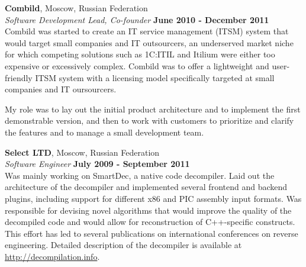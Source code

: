 \documentclass[margin,line]{CV}
\begin{document}
\begin{resume}
    
    \textbf{Combild}, Moscow, Russian Federation \vspace{2mm}\\\vspace{1mm}%
    \textsl{Software Development Lead, Co-founder} \hfill \textbf{June 2010 - December 2011}\\
    Combild was started to create an IT service management (ITSM) system that would target small companies and IT outsourcers, an underserved market niche for which competing solutions such as 1C:ITIL and Itilium were either too expensive or excessively complex. Combild was to offer a lightweight and user-friendly ITSM system with a licensing model specifically targeted at small companies and IT oursourcers.


    My role was to lay out the initial product architecture and to implement the first demonstrable version, and then to work with customers to prioritize and clarify the features and to manage a small development team. 
    

    
    \textbf{Select LTD}, Moscow, Russian Federation \vspace{2mm}\\\vspace{1mm}%
    \textsl{Software Engineer} \hfill \textbf{July 2009 - September 2011}\\
    Was mainly working on SmartDec, a native code decompiler. Laid out the architecture of the decompiler and implemented several frontend and backend plugins, including support for different x86 and PIC assembly input formats. Was responsible for devising novel algorithms that would improve the quality of the decompiled code and would allow for reconstruction of C++-specific constructs. This effort has led to several publications on international conferences on reverse engineering. Detailed description of the decompiler is available at \url{http://decompilation.info}.
    

\end{resume}
\end{document}
